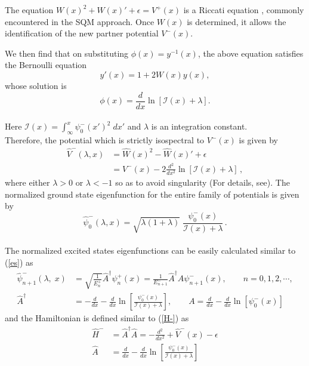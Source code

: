 \documentclass[11pt]{article}
\begin{document}
The equation $W(x)^2+W(x)'+\epsilon=V^+(x)$ is a Riccati equation \cite{mielnik1984factorization}, commonly encountered in the SQM approach. Once $W(x)$ is determined, it allows the identification of the new partner potential $V^-(x)$.
%

We then find that on substituting \( \phi(x)= y^{-1}(x)\), the above equation 
satisfies the Bernoulli equation
\begin{equation*}
y'(x)=1+2W(x)y(x),
\end{equation*}
whose solution is 
\begin{equation*}
\phi(x)= \frac{d}{dx}\ln\left[\mathcal{I}(x)+\lambda\right].
\end{equation*}\\
Here \( \mathcal{I}(x)=\int^{x}_{\infty} \psi^-_{0}(x')^2\;dx' \) and $\lambda$ is an integration constant.\\

Therefore, the potential which is strictly isospectral to \( V^-(x) \) is 
given by 
\begin{align}
\hat{V}^-(\lambda, x)&= \hat{W}(x)^2- \hat{W}(x)' +\epsilon \nonumber\\
&=V^-(x)-2 \frac{d^2}{dx^2}\ln\left[\mathcal{I}(x)+\lambda\right]\,,
\end{align}
where either $\lambda > 0$ or $\lambda < -1$ so as to avoid singularity
(For details, see\cite{cooper1995supersymmetry, yadav2022one}). The 
normalized ground state eigenfunction for the entire family of potentials
is given by
\begin{equation}
\hat{\psi}^-_{0}(\lambda, x)= \sqrt{\lambda(1+\lambda)}\;\frac{\psi^-_{0}(x)}
{\mathcal{I}(x)+\lambda}\,.\label{iso-gs}
\end{equation}\\
The normalized excited states eigenfunctions can be easily calculated similar to (\ref{es}) as
\begin{align}
\hat{\psi}^-_{n+1}(\lambda,\;x)&= \sqrt{\frac{1}{E^+_n}} \hat{A}^{\dagger}\psi^+_n(x)=\frac{1}{E^-_{n+1}} \hat{A}^{\dagger}A \psi^-_{n+1}(x)\label{iso-es},\qquad n=0,1,2,\cdots,\\
\hat{A}^{\dagger}&=-\frac{d}{dx}-\frac{d}{dx}\ln\left[\frac{\psi^-_{0}(x)}{\mathcal{I}(x)+\lambda}\right], \qquad A =\frac{d}{dx}-\frac{d}{dx}\ln\left[\psi^-_{0}(x)\right]\nonumber
\end{align}
and the Hamiltonian is defined similar to (\ref{H-}) as 
\begin{align}
\hat{H}^-&=\hat{A}^{\dagger} \hat{A}= - \frac{d^2}{dx^2}+\hat{V}^-(x)-\epsilon\label{Hiso-}\\
\hat{A}&=\frac{d}{dx}-\frac{d}{dx}\ln\left[\frac{\psi^-_{0}(x)}{\mathcal{I}(x)+\lambda}\right]\nonumber
\end{align}
\end{document}
